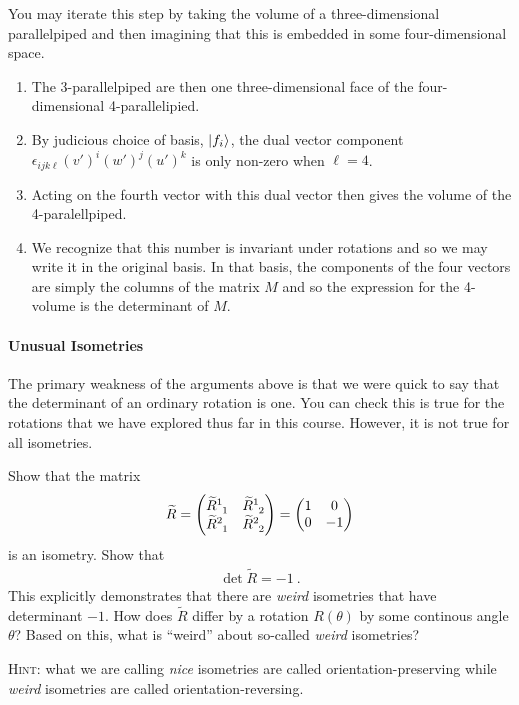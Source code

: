 You may iterate this step by taking the volume of a three-dimensional parallelpiped and then imagining that this is embedded in some four-dimensional space. 
\begin{enumerate}
    \item The 3-parallelpiped are then one three-dimensional face of the four-dimensional 4-parallelipied.
    \item  By judicious choice of basis, $\left|f_i\right\rangle$, the dual vector component $\epsilon_{ijk\ell}(v')^i(w')^j(u')^k$ is only non-zero when $\ell=4$.
    \item  Acting on the fourth vector with this dual vector then gives the volume of the 4-paralellpiped.
    \item  We recognize that this number is invariant under rotations and so we may write it in the original basis. In that basis, the components of the four vectors are simply the columns of the matrix $M$ and so the expression for the 4-volume is the determinant of $M$.
\end{enumerate}


\paragraph{Unusual Isometries} The primary weakness of the arguments above is that we were quick to say that the determinant of an ordinary rotation is one. You can check this is true for the rotations that we have explored thus far in this course. However, it is not true for all isometries. 

\begin{exercise}\label{ex:orientation:2d}
Show that the matrix
\begin{align}
    \tilde R = 
    \begin{pmatrix}
        \tilde R\aij{1}{1} & \tilde R\aij{1}{2}\\
        \tilde R\aij{2}{1} & \tilde R\aij{2}{2}
    \end{pmatrix}
    =
    \begin{pmatrix}
     1 & 0 \\
     0 & -1   
    \end{pmatrix}
\end{align}
is an isometry. Show that
\begin{align}
    \det \tilde R = -1 \ .
\end{align}
This explicitly demonstrates that there are \emph{weird} isometries that have determinant $-1$. How does $\tilde R$ differ by a rotation $R(\theta)$ by some continous angle $\theta$? Based on this, what is ``weird'' about so-called \emph{weird} isometries?

\textsc{Hint:} what we are calling \emph{nice} isometries are called orientation-preserving while \emph{weird} isometries are called orientation-reversing.
\end{exercise}

